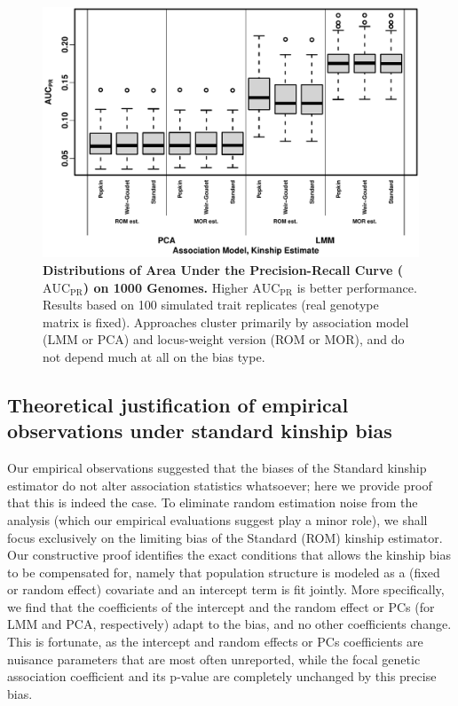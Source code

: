 \documentclass[11pt]{article}
\newcommand{\auc}{\text{AUC}_\text{PR}}
\begin{document}
\begin{figure}[bp!]
  \centering
  \includegraphics[width=\textwidth]{tgp-nygc-autosomes_ld_prune_1000kb_0.3_maf-0.01/auc.pdf}
  \caption{
    {\bf Distributions of Area Under the Precision-Recall Curve ($\auc$) on 1000 Genomes.}
    Higher $\auc$ is better performance.
    Results based on 100 simulated trait replicates (real genotype matrix is fixed).
    Approaches cluster primarily by association model (LMM or PCA) and locus-weight version (ROM or MOR), and do not depend much at all on the bias type.
  }
  \label{fig:auc_real}
\end{figure}




\subsection{Theoretical justification of empirical observations under standard kinship bias}

Our empirical observations suggested that the biases of the Standard kinship estimator do not alter association statistics whatsoever; here we provide proof that this is indeed the case.
To eliminate random estimation noise from the analysis (which our empirical evaluations suggest play a minor role), we shall focus exclusively on the limiting bias of the Standard (ROM) kinship estimator.
Our constructive proof identifies the exact conditions that allows the kinship bias to be compensated for, namely that population structure is modeled as a (fixed or random effect) covariate and an intercept term is fit jointly.
More specifically, we find that the coefficients of the intercept and the random effect or PCs (for LMM and PCA, respectively) adapt to the bias, and no other coefficients change.
This is fortunate, as the intercept and random effects or PCs coefficients are nuisance parameters that are most often unreported, while the focal genetic association coefficient and its p-value are completely unchanged by this precise bias.
\end{document}
